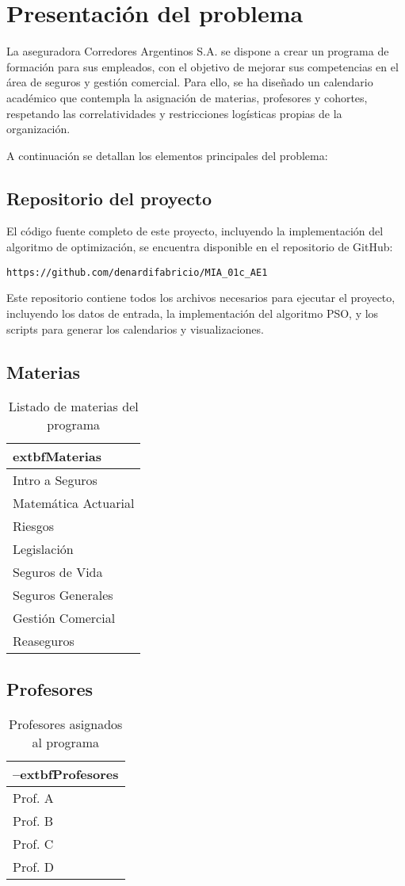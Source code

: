 \section{Presentación del problema}
La aseguradora Corredores Argentinos S.A. se dispone a crear un programa de formación para sus empleados, con el objetivo de mejorar sus competencias en el área de seguros y gestión comercial. Para ello, se ha diseñado un calendario académico que contempla la asignación de materias, profesores y cohortes, respetando las correlatividades y restricciones logísticas propias de la organización.

A continuación se detallan los elementos principales del problema:

\subsection*{Repositorio del proyecto}
El código fuente completo de este proyecto, incluyendo la implementación del algoritmo de optimización, se encuentra disponible en el repositorio de GitHub:

\texttt{https://github.com/denardifabricio/MIA\_01c\_AE1}

Este repositorio contiene todos los archivos necesarios para ejecutar el proyecto, incluyendo los datos de entrada, la implementación del algoritmo PSO, y los scripts para generar los calendarios y visualizaciones.

\subsection*{Materias}
\begin{table}[ht]
\centering
\begin{tabular}{|l|}
\hline
	extbf{Materias} \\
\hline
Intro a Seguros \\
Matemática Actuarial \\
Riesgos \\
Legislación \\
Seguros de Vida \\
Seguros Generales \\
Gestión Comercial \\
Reaseguros \\
\hline
\end{tabular}
\caption{Listado de materias del programa}
\end{table}

\subsection*{Profesores}
\begin{table}[ht]
\centering
\begin{tabular}{|l|}
\hline
	–extbf{Profesores} \\
\hline
Prof. A \\
Prof. B \\
Prof. C \\
Prof. D \\
\hline
\end{tabular}
\caption{Profesores asignados al programa}
\end{table}


